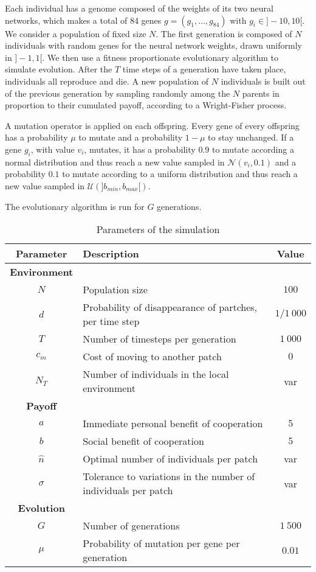 \documentclass[twocolumn]{article}
\begin{document}
Each individual has a genome composed of the weights of its two neural networks, which makes a total of 84 genes $g = (g_{1}, \ldots, g_{84})$ with $ g_{i} \in ]-10, 10[$. We consider a population of fixed size $N$. The first generation is composed of $N$ individuals with random genes for the neural network weights, drawn uniformly in $]-1, 1[$. We then use a fitness proportionate evolutionary algorithm to simulate  evolution.  After the $T$ time steps of a generation have taken place, individuals all reproduce and die. A new population of $N$ individuals is built out of the previous generation by sampling randomly among the $N$ parents in proportion to their cumulated payoff, according to a Wright-Fisher process.

A mutation operator is applied on each offspring. Every gene of every offspring has a probability $\mu$ to mutate and a probability $1-\mu$ to stay unchanged. If a gene $g_i$, with value $v_i$, mutates, it has a probability $0.9$ to mutate according a normal distribution and thus reach a new value sampled in $\mathcal{N}(v_i, 0.1)$ and a probability $0.1$ to mutate according to a uniform distribution and thus reach a new value sampled in $\mathcal{U}(]b_{min}, b_{max}[)$.

The evolutionary algorithm is run for $G$ generations.


\begin{table}
    \centering
    \begin{tabular}{clc}
        \hline
        \textbf{Parameter} & \textbf{Description} & \textbf{Value}  \\
        \hline
        \textbf{Environment} & & \\
        $N$ & Population size & $100$ \\
        $d$ & Probability of disappearance of partches, per time step & $1/1\ 000$ \\
        $T$ & Number of timesteps per generation & $1\ 000$ \\
        $c_{m}$ & Cost of moving to another patch & $0$ \\
        $N_T$ & Number of individuals in the local environment & var \\

        \textbf{Payoff } & & \\
        $a$ & Immediate personal benefit of cooperation & $5$ \\
        $b$ & Social benefit of cooperation & $5$ \\
        $\hat{n}$ & Optimal number of individuals per patch & var \\
        $\sigma$ & Tolerance to variations in the number of individuals per patch & var \\
        \textbf{Evolution} & & \\
        $G$ & Number of generations & $1\ 500$ \\
        $\mu$ & Probability of mutation per gene per generation & $0.01$ \\
        \hline

    \end{tabular}
    \caption{Parameters of the simulation}
    \label{tab:parameters}
\end{table}
\end{document}
